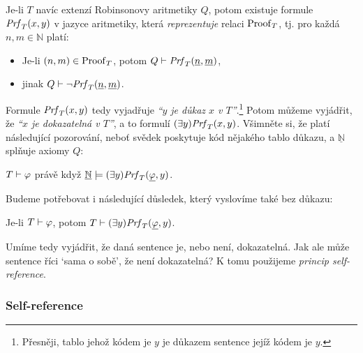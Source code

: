 \begin{proposition}
Je-li $T$ navíc extenzí Robinsonovy aritmetiky $Q$, potom existuje formule $\mathit{Prf}_T(x,y)$ v jazyce aritmetiky, která \emph{reprezentuje} relaci $\operatorname{Proof}_T$, tj. pro každá $n,m\in\mathbb N$ platí:
\begin{itemize}
    \item Je-li $(n,m)\in\operatorname{Proof}_T$, potom $Q\vdash\mathit{Prf}_T(\underline{n},\underline{m})$,
    \item jinak $Q\vdash\neg\mathit{Prf}_T(\underline{n},\underline{m})$.
\end{itemize} 
\end{proposition}

Formule $\mathit{Prf}_T(x,y)$ tedy vyjadřuje \emph{``$y$ je důkaz $x$ v $T$''}.\footnote{Přesněji, tablo jehož kódem je $y$ je důkazem sentence jejíž kódem je $y$.} Potom můžeme vyjádřit, že \emph{``$x$ je dokazatelná v $T$''}, a to formulí $(\exists y)\mathit{Prf}_T(x,y)$. Všimněte si, že platí následující pozorování, neboť svědek poskytuje kód nějakého tablo důkazu, a $\underline{\mathbb N}$ splňuje axiomy $Q$:
\begin{observation}\label{observation:proof-predicate}
$T\vdash\varphi$ právě když $\underline{\mathbb N}\models (\exists y)\mathit{Prf}_T(\underline{\varphi},y)$.  
\end{observation}
Budeme potřebovat i následující důsledek, který vyslovíme také bez důkazu:
\begin{corollary}\label{corollary:predicate-of-provability}
    Je-li $T\vdash\varphi$, potom $T\vdash (\exists y)\mathit{Prf}_T(\underline{\varphi},y)$.
\end{corollary}

Umíme tedy vyjádřit, že daná sentence je, nebo není, dokazatelná. Jak ale může sentence říci `sama o sobě', že není dokazatelná? K tomu použijeme \emph{princip self-reference}.

\subsubsection*{Self-reference}

